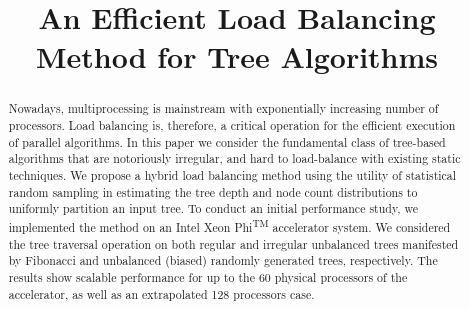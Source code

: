 \documentclass[conference,compsoc]{IEEEtran}
\begin{document}
%
\title{An Efficient Load Balancing Method for Tree Algorithms}


\author{
}

\maketitle

\begin{abstract}
	Nowadays, multiprocessing is mainstream with exponentially increasing number of processors. Load balancing is, therefore, a critical operation for the efficient execution of parallel algorithms. In this paper we consider the fundamental class of tree-based algorithms that are notoriously irregular, and hard to load-balance with existing static techniques. We propose a hybrid load balancing method using the utility of statistical random sampling in estimating the tree depth and node count distributions to uniformly partition an input tree. To conduct an initial performance study, we implemented the method on an Intel\textsuperscript{\textregistered} Xeon Phi\textsuperscript{TM} accelerator system. We considered the tree traversal operation on both regular and irregular unbalanced trees manifested by Fibonacci and unbalanced (biased) randomly generated trees, respectively. The results show scalable performance for up to the 60 physical processors of the accelerator, as well as an extrapolated 128 processors case.
\end{abstract}
\end{document}
